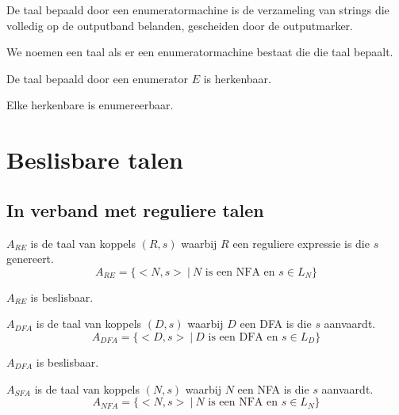 \documentclass[main.tex]{subfiles}
\begin{document}
\begin{de}
  De taal bepaald door een enumeratormachine is de verzameling van strings die volledig op de outputband belanden, gescheiden door de outputmarker.
\end{de}

\begin{de}
  We noemen een taal  als er een enumeratormachine bestaat die die taal bepaalt.
\end{de}

\begin{st}
  De taal bepaald door een enumerator $E$ is herkenbaar.
\end{st}

\begin{st}
  Elke herkenbare is enumereerbaar.
\end{st}

\section{Beslisbare talen}
\label{sec:beslisbare-talen}

\subsection{In verband met reguliere talen}
\label{sec:verb-met-regul}

\begin{de}
  \label{de:a-re}
  $A_{RE}$ is de taal van koppels $(R,s)$ waarbij $R$ een reguliere expressie is die $s$ genereert.
  \[ A_{RE} = \{ <N,s> \ |\ N \text{ is een NFA en } s \in L_{N} \} \]
\end{de}

\begin{st}
  $A_{RE}$ is beslisbaar.
\end{st}

\begin{de}
  $A_{DFA}$ is de taal van koppels $(D,s)$ waarbij $D$ een DFA is die $s$ aanvaardt.
  \[ A_{DFA} = \{ <D,s> \ |\ D \text{ is een DFA en } s \in L_{D} \} \]
\end{de}

\begin{st}
  $A_{DFA}$ is beslisbaar.
\end{st}

\begin{de}
  $A_{SFA}$ is de taal van koppels $(N,s)$ waarbij $N$ een NFA is die $s$ aanvaardt.
  \[ A_{NFA} = \{ <N,s> \ |\ N \text{ is een NFA en } s \in L_{N} \} \]
\end{de}
\end{document}
